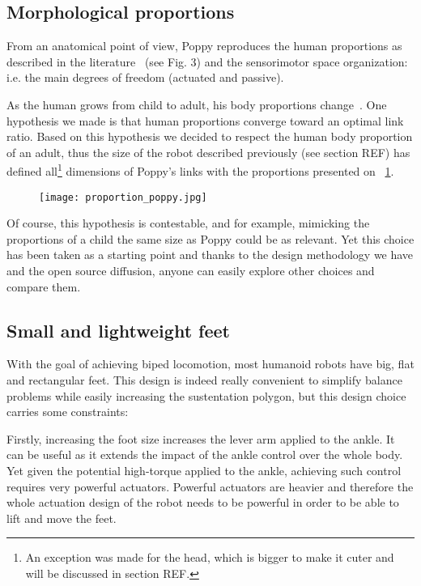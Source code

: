 \subsection{Morphological proportions} %

From an anatomical point of view, Poppy reproduces the human proportions as described in the literature~\parencite{dufour2005biomecanique} (see Fig. 3) and the sensorimotor space organization: i.e. the main degrees of freedom (actuated and passive).

As the human grows from child to adult, his body proportions change~\parencite{bogin2010leg}. One hypothesis we made is that human proportions converge toward an optimal link ratio. Based on this hypothesis we decided to respect the human body proportion of an adult, thus the size of the robot described previously (see section REF) has defined all\footnote{An exception was made for the head, which is bigger to make it cuter and will be discussed in section REF.} dimensions  of Poppy's links with the proportions presented on \figurename~\ref{fig:poppy-human-proportion}.

\begin{figure}[tb]
    \begin{center}
        \texttt{[image: proportion\_poppy.jpg]}
    \end{center}
    \caption{}
    \label{fig:poppy-human-proportion}
\end{figure}

Of course, this hypothesis is contestable, and for example, mimicking the proportions of a child  the same size as Poppy could be as relevant. Yet this choice has been taken as a starting point and thanks to the design methodology we have and the open source diffusion, anyone can easily explore other choices and compare them.

\subsection{Small and lightweight feet} %

With the goal of achieving biped locomotion, most humanoid robots have big, flat and rectangular feet. This design is indeed really convenient to simplify balance problems while easily increasing the sustentation polygon, but this design choice carries some constraints:

Firstly, increasing the foot size increases the lever arm applied to the ankle. It can be useful as it extends the impact of the ankle control over the whole body. Yet given the potential high-torque applied to the ankle, achieving such control requires very powerful actuators.
Powerful actuators are heavier and therefore the whole actuation design of the robot needs to be powerful in order to be able to lift and move the feet.

